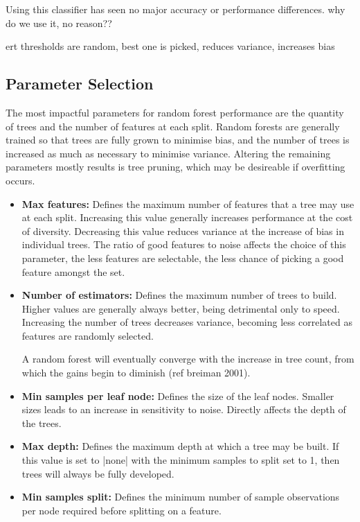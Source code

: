 Using this classifier has seen no major accuracy or performance differences.
why do we use it, no reason??

ert thresholds are random, best one is picked, reduces variance, increases bias

\subsection{Parameter Selection}
The most impactful parameters for random forest performance are the quantity of
trees and the number of features at each split.
Random forests are generally trained so that trees are fully grown to minimise
bias, and the number of trees is increased as much as necessary to minimise variance.
Altering the remaining parameters mostly results is tree pruning, which may be
desireable if overfitting occurs.

\begin{itemize}
  \item \textbf{Max features:}
    Defines the maximum number of features that a tree may use at each split.
    Increasing this value generally increases performance at the cost of
    diversity.
    Decreasing this value reduces variance at the increase of bias in individual
    trees.
    The ratio of good features to noise affects the choice of this parameter,
    the less features are selectable, the less chance of picking a good feature
    amongst the set.

  \item \textbf{Number of estimators:}
    Defines the maximum number of trees to build.
    Higher values are generally always better, being detrimental only to speed.
    Increasing the number of trees decreases variance, becoming less
    correlated as features are randomly selected.

    A random forest will eventually converge with the increase in tree count,
    from which the gains begin to diminish (ref breiman 2001).

  \item \textbf{Min samples per leaf node:}
    Defines the size of the leaf nodes.
    Smaller sizes leads to an increase in sensitivity to noise.
    Directly affects the depth of the trees.

  \item \textbf{Max depth:}
    Defines the maximum depth at which a tree may be built.
    If this value is set to |none| with the minimum samples to split set to 1,
    then trees will always be fully developed.

  \item \textbf{Min samples split:}
    Defines the minimum number of sample observations per node required before
    splitting on a feature.
\end{itemize}

